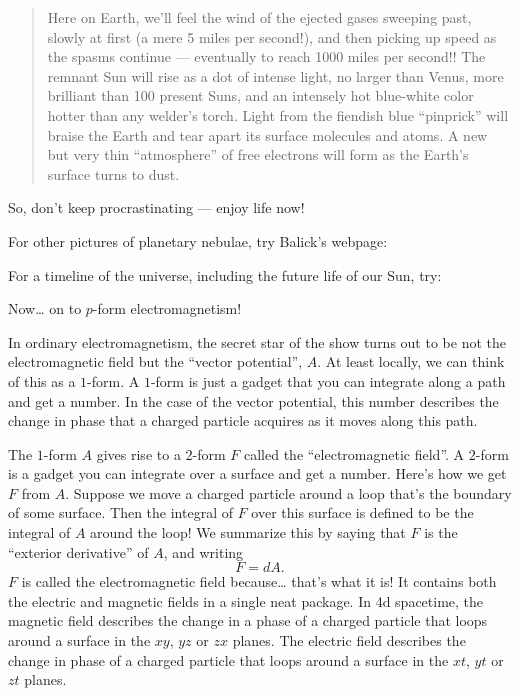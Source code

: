\documentclass{article}
\def\tightlist{}
\renewcommand{\texttt}[1]{%
  \begingroup
  \ttfamily
  \begingroup\lccode`~=`/\lowercase{\endgroup\def~}{/\discretionary{}{}{}}%
  \begingroup\lccode`~=`[\lowercase{\endgroup\def~}{[\discretionary{}{}{}}%
  \begingroup\lccode`~=`.\lowercase{\endgroup\def~}{.\discretionary{}{}{}}%
  \catcode`/=\active\catcode`[=\active\catcode`.=\active
  \scantokens{#1\noexpand}%
  \endgroup
}
\begin{document}
\begin{quote}
Here on Earth, we'll feel the wind of the ejected gases sweeping past,
slowly at first (a mere 5 miles per second!), and then picking up speed
as the spasms continue --- eventually to reach 1000 miles per second!!
The remnant Sun will rise as a dot of intense light, no larger than
Venus, more brilliant than 100 present Suns, and an intensely hot
blue-white color hotter than any welder's torch. Light from the fiendish
blue ``pinprick'' will braise the Earth and tear apart its surface
molecules and atoms. A new but very thin ``atmosphere'' of free
electrons will form as the Earth's surface turns to dust.
\end{quote}

So, don't keep procrastinating --- enjoy life now!

For other pictures of planetary nebulae, try Balick's webpage:


For a timeline of the universe, including the future life of our Sun,
try:


Now\ldots{} on to \(p\)-form electromagnetism!

In ordinary electromagnetism, the secret star of the show turns out to
be not the electromagnetic field but the ``vector potential'', \(A\). At
least locally, we can think of this as a \(1\)-form. A \(1\)-form is
just a gadget that you can integrate along a path and get a number. In
the case of the vector potential, this number describes the change in
phase that a charged particle acquires as it moves along this path.

The \(1\)-form \(A\) gives rise to a \(2\)-form \(F\) called the
``electromagnetic field''. A \(2\)-form is a gadget you can integrate
over a surface and get a number. Here's how we get \(F\) from \(A\).
Suppose we move a charged particle around a loop that's the boundary of
some surface. Then the integral of \(F\) over this surface is defined to
be the integral of \(A\) around the loop! We summarize this by saying
that \(F\) is the ``exterior derivative'' of \(A\), and writing
\[F = dA.\] \(F\) is called the electromagnetic field because\ldots{}
that's what it is! It contains both the electric and magnetic fields in
a single neat package. In 4d spacetime, the magnetic field describes the
change in a phase of a charged particle that loops around a surface in
the \(xy\), \(yz\) or \(zx\) planes. The electric field describes the
change in phase of a charged particle that loops around a surface in the
\(xt\), \(yt\) or \(zt\) planes.
\end{document}
